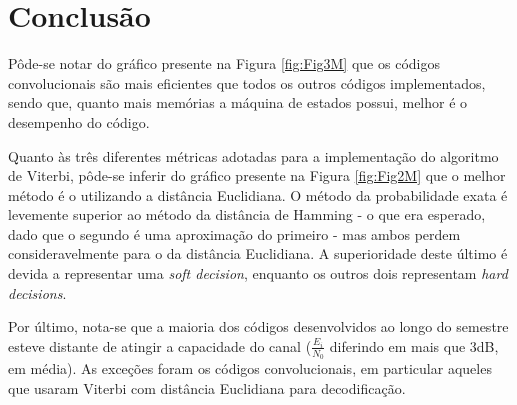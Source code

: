 \section{Conclusão}

 Pôde-se notar do gráfico presente na Figura \ref{fig:Fig3M} que os códigos convolucionais são mais eficientes que todos os outros códigos implementados, sendo que, quanto mais memórias a máquina de estados possui, melhor é o desempenho do código.
 
 Quanto às três diferentes métricas adotadas para a implementação do algoritmo de Viterbi, pôde-se inferir do gráfico presente na Figura \ref{fig:Fig2M} que o melhor método é o utilizando a distância Euclidiana. O método da probabilidade exata é levemente superior ao método da distância de Hamming - o que era esperado, dado que o segundo é uma aproximação do primeiro - mas ambos perdem consideravelmente para o da distância Euclidiana. A superioridade deste último é devida a representar uma \textit{soft decision}, enquanto os outros dois representam \textit{hard decisions}.

 Por último, nota-se que a maioria dos códigos desenvolvidos ao longo do semestre esteve distante de atingir a capacidade do canal ($\frac{E_i}{N_0}$ diferindo em mais que 3dB, em média). As exceções foram os códigos convolucionais, em particular aqueles que usaram Viterbi com distância Euclidiana para decodificação.